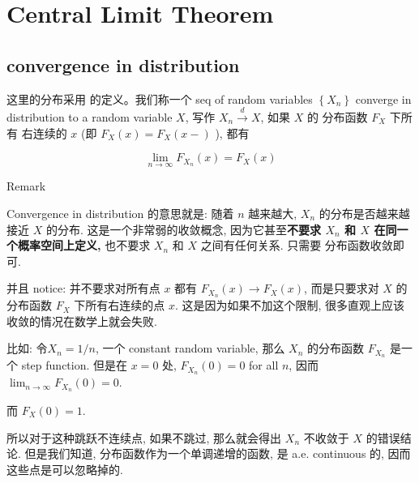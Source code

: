 \chapter{Central Limit Theorem}\label{central-limit-theorem}

\section{convergence in distribution}\label{convergence-in-distribution}

\begin{definition}{}

这里的分布采用  的定义。我们称一个 seq of random variables \(\left\{ \mathit{X}_{\mathit{n}} \right\}\) converge in distribution to a random variable \(\mathit{X}\), 写作 \(\mathit{X}_{\mathit{n}}\overset{\mathit{d}}{\rightarrow}\mathit{X}\), 如果 \(\mathit{X}\) 的 分布函数 \(\mathit{F}_{\mathit{X}}\) 下所有 右连续的 \(\mathit{x}\) (即 \(\mathit{F}_{\mathit{X}}(\mathit{x}) = \mathit{F}_{\mathit{X}}(\mathit{x} - )\) ), 都有

\[\lim\limits_{\mathit{n}\rightarrow\infty}\mathit{F}_{\mathit{X}_{\mathit{n}}}(\mathit{x}) = \mathit{F}_{\mathit{X}}(\mathit{x})\]

\end{definition}

\begin{qlremark}{Remark}

Convergence in distribution 的意思就是: 随着 \(\mathit{n}\) 越来越大, \(\mathit{X}_{\mathit{n}}\) 的分布是否越来越接近 \(\mathit{X}\) 的分布. 这是一个非常弱的收敛概念, 因为它甚至\textbf{不要求 \(\mathit{X}_{\mathit{n}}\) 和 \(\mathit{X}\) 在同一个概率空间上定义,} 也不要求 \(\mathit{X}_{\mathit{n}}\) 和 \(\mathit{X}\) 之间有任何关系. 只需要 分布函数收敛即可.

并且 notice: 并不要求对所有点 \(\mathit{x}\) 都有 \(\mathit{F}_{\mathit{X}_{\mathit{n}}}(\mathit{x})\rightarrow\mathit{F}_{\mathit{X}}(\mathit{x})\), 而是只要求对 \(\mathit{X}\) 的分布函数 \(\mathit{F}_{\mathit{X}}\) 下所有右连续的点 \(\mathit{x}\). 这是因为如果不加这个限制, 很多直观上应该收敛的情况在数学上就会失败.

比如: 令\(\mathit{X}_{\mathit{n}} = 1/\mathit{n}\), 一个 constant random variable, 那么 \(\mathit{X}_{\mathit{n}}\) 的分布函数 \(\mathit{F}_{\mathit{X}_{\mathit{n}}}\) 是一个 step function. 但是在 \(\mathit{x} = 0\) 处, \(\mathit{F}_{\mathit{X}_{\mathit{n}}}(0) = 0\) for all \(\mathit{n}\), 因而 \(\lim_{\mathit{n}\rightarrow\infty}\mathit{F}_{\mathit{X}_{\mathit{n}}}(0) = 0\).

而 \(\mathit{F}_{\mathit{X}}(0) = 1\).

所以对于这种跳跃不连续点, 如果不跳过, 那么就会得出 \(\mathit{X}_{\mathit{n}}\) 不收敛于 \(\mathit{X}\) 的错误结论. 但是我们知道, 分布函数作为一个单调递增的函数, 是 a.e. continuous 的, 因而这些点是可以忽略掉的.

\end{qlremark}

